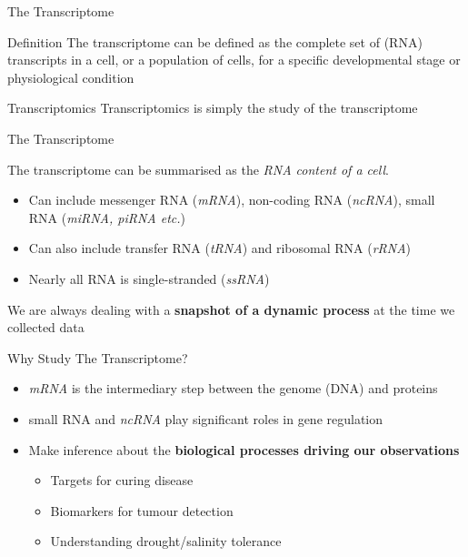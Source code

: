 \documentclass[aspectratio=169,11pt]{beamer}
\begin{document}
\linespread{1.05}

\begin{frame}{The Transcriptome}

	\begin{block}{Definition}
	The transcriptome can be defined as the complete set of (RNA) transcripts in a cell, or a population of cells, for a specific developmental stage or physiological condition
	\end{block}
	
	\begin{block}{Transcriptomics}
	Transcriptomics is simply the study of the transcriptome
	\end{block}
	

\end{frame}

\begin{frame}{The Transcriptome}

	The transcriptome can be summarised as the \textit{RNA content of a cell}.\\[3mm]
	
	\begin{itemize}
		\item Can include messenger RNA (\textit{mRNA}), non-coding RNA (\textit{ncRNA}), small RNA (\textit{miRNA, piRNA etc.})
		\item Can also include transfer RNA (\textit{tRNA}) and ribosomal RNA (\textit{rRNA})
		\item Nearly all RNA is single-stranded (\textit{ssRNA})
	\end{itemize}
	
	\vspace{3mm}
	
	We are always dealing with a \textbf{snapshot of a dynamic process} at the time we collected data

\end{frame}

\begin{frame}{Why Study The Transcriptome?}

	\begin{itemize}
		\item \textit{mRNA} is the intermediary step between the genome (DNA) and proteins
		\item small RNA and \textit{ncRNA} play significant roles in gene regulation
		\item Make inference about the \textbf{biological processes driving our observations}
		\begin{itemize}
			\item Targets for curing disease
			\item Biomarkers for tumour detection
			\item Understanding drought/salinity tolerance
		\end{itemize}

	\end{itemize}
	
\end{frame}
\end{document}
